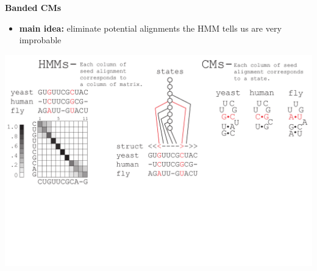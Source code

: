 \documentclass[landscape]{slides}
\begin{document}
\begin{slide}
\begin{center}
\large
\textbf{Banded CMs}
\end{center}
\medskip
\small
\begin{itemize}
\item
\textbf{main idea:} eliminate potential alignments the HMM tells us are very improbable
\end{itemize}
\begin{center}
\includegraphics[width=8in]{figs/post_hmm_to_cm_map2_layer8}
\end{center}
\vfill
\end{slide}
\end{document}
